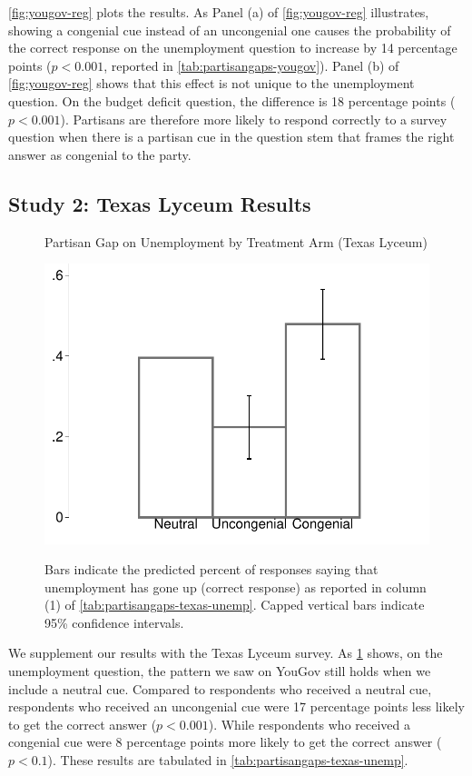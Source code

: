\documentclass[12pt, letterpaper]{article}
\begin{document}
\cref{fig:yougov-reg} plots the results. As Panel (a) of \cref{fig:yougov-reg} illustrates, showing a congenial cue instead of an uncongenial one causes the probability of the correct response on the unemployment question to increase by 14 percentage points ($p < 0.001$, reported in \cref{tab:partisangaps-yougov}). Panel (b) of \cref{fig:yougov-reg} shows that this effect is not unique to the unemployment question. On the budget deficit question, the difference is 18 percentage points ($p<0.001$). Partisans are therefore more likely to respond correctly to a survey question when there is a partisan cue in the question stem that frames the right answer as congenial to the party.

\subsection*{Study 2: Texas Lyceum Results}\label{subsec:txlyceum_results}

\begin{figure}[!t]
	\centering
	\caption{Partisan Gap on Unemployment by Treatment Arm (Texas Lyceum)}
	\includegraphics[width=.55\textwidth]{../figs/texas-unemp-congenialcue.pdf}
	\label{fig:partisangaps-texas-unemp}
	\caption*{\footnotesize 
		Bars indicate the predicted percent of responses saying that unemployment has gone up (correct response) as reported in column (1) of \cref{tab:partisangaps-texas-unemp}.  
		Capped vertical bars indicate 95\% confidence intervals.
	}
\end{figure}

We supplement our results with the Texas Lyceum survey. As \cref{fig:partisangaps-texas-unemp} shows, on the unemployment question, the pattern we saw on YouGov still holds when we include a neutral cue. Compared to respondents who received a neutral cue, respondents who received an uncongenial cue were 17 percentage points less likely to get the correct answer ($p<0.001$). While respondents who received a congenial cue were 8 percentage points more likely to get the correct answer ($p<0.1$). These results are tabulated in \cref{tab:partisangaps-texas-unemp}.
\end{document}

